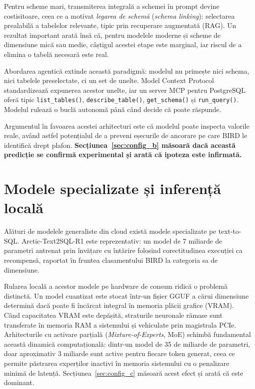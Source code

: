 \documentclass[12pt,a4paper]{report}
\newcommand{\code}[1]{\texttt{\small #1}}
\begin{document}
Pentru scheme mari, transmiterea integrală a schemei în prompt devine
costisitoare, ceea ce a motivat \emph{legarea de schemă} (\emph{schema
linking}): selectarea prealabilă a tabelelor relevante, tipic prin
recuperare augmentată (RAG). Un rezultat important \cite{deathschema} arată
însă că, pentru modelele moderne și scheme de dimensiune mică sau medie,
câștigul acestei etape este marginal, iar riscul de a elimina o tabelă
necesară este real.

Abordarea agentică extinde această paradigmă: modelul nu primește nici schema,
nici tabelele preselectate, ci un set de unelte. Model Context Protocol
\cite{mcp} standardizează expunerea acestor unelte, iar un server MCP pentru
PostgreSQL oferă tipic \code{list\_tables()}, \code{describe\_table()},
\code{get\_schema()} și \code{run\_query()}. Modelul rulează o buclă
autonomă până când decide că poate răspunde.

Argumentul în favoarea acestei arhitecturi este că modelul poate inspecta
valorile reale, având astfel potențialul de a preveni eșecurile de ancorare pe care
BIRD le identifică drept plafon. \textbf{Secțiunea~\ref{sec:config_b} măsoară dacă această
predicție se confirmă experimental și arată că ipoteza este infirmată.}

\section{Modele specializate și inferență locală}

Alături de modelele generaliste din cloud există modele specializate pe
text-to-SQL. Arctic-Text2SQL-R1 \cite{arctic} este reprezentativ: un model
de 7 miliarde de parametri antrenat prin învățare cu întărire folosind
corectitudinea execuției ca recompensă, raportat în fruntea clasamentului
BIRD la categoria sa de dimensiune.

Rularea locală a acestor modele pe hardware de consum ridică o problemă
distinctă. Un model cuantizat este stocat într-un fișier GGUF a cărui
dimensiune determină dacă poate fi încărcat integral în memoria plăcii grafice (VRAM).
Când capacitatea VRAM este depășită, straturile neuronale rămase sunt transferate în memoria
RAM a sistemului și vehiculate prin magistrala PCIe. Arhitecturile cu activare parțială
(\emph{Mixture-of-Experts}, MoE) schimbă fundamental această dinamică computațională:
dintr-un model de 35 de miliarde de parametri, doar aproximativ 3 miliarde sunt active
pentru fiecare token generat, ceea ce permite păstrarea experților inactivi în memoria
sistemului cu o penalizare minimă de latență.
Secțiunea~\ref{sec:config_c} măsoară acest efect și arată că este dominant.
\end{document}
